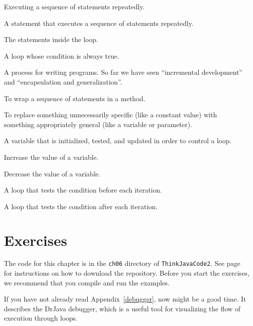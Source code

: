 \begin{description}

Executing a sequence of statements repeatedly.

A statement that executes a sequence of statements repeatedly.

The statements inside the loop.

A loop whose condition is always true.

A process for writing programs.
So far we have seen ``incremental development'' and ``encapsulation and generalization''.

To wrap a sequence of statements in a method.

To replace something unnecessarily specific (like a constant value) with something appropriately general (like a variable or parameter).

A variable that is initialized, tested, and updated in order to control a loop.

Increase the value of a variable.

Decrease the value of a variable.

A loop that tests the condition before each iteration.

A loop that tests the condition after each iteration.

\end{description}


\section{Exercises}

The code for this chapter is in the {\tt ch06} directory of {\tt ThinkJavaCode2}.
See page~\pageref{code} for instructions on how to download the repository.
Before you start the exercises, we recommend that you compile and run the examples.

If you have not already read Appendix~\ref{debugger}, now might be a good time.
It describes the DrJava debugger, which is a useful tool for visualizing the flow of execution through loops.


